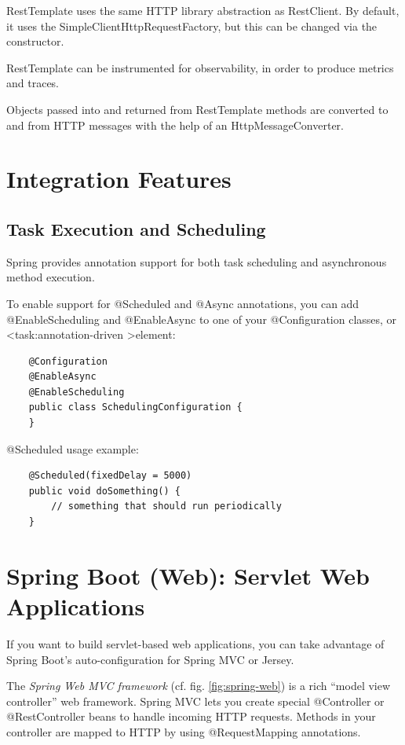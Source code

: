 \documentclass{scrartcl}
\begin{document}
RestTemplate uses the same HTTP library abstraction as RestClient. By default, it uses the SimpleClientHttpRequestFactory, but this can be changed via the constructor.

RestTemplate can be instrumented for observability, in order to produce metrics and traces.

Objects passed into and returned from RestTemplate methods are converted to and from HTTP messages with the help of an HttpMessageConverter.

\section{Integration Features}

\subsection{Task Execution and Scheduling}
Spring provides annotation support for both task scheduling and asynchronous method execution.

To enable support for @Scheduled and @Async annotations, you can add @EnableScheduling and @EnableAsync to one of your @Configuration classes, or \textless task:annotation-driven \textgreater element:

\begin{lstlisting}
    @Configuration
    @EnableAsync
    @EnableScheduling
    public class SchedulingConfiguration {
    }

\end{lstlisting}

@Scheduled usage example:

\begin{lstlisting}
    @Scheduled(fixedDelay = 5000)
    public void doSomething() {
        // something that should run periodically
    }
\end{lstlisting}

\section{Spring Boot (Web): Servlet Web Applications}

If you want to build servlet-based web applications, you can take advantage of Spring Boot’s auto-configuration for Spring MVC or Jersey.

The \textit{Spring Web MVC framework} (cf. fig. \ref{fig:spring-web}) is a rich “model view controller” web framework.
Spring MVC lets you create special @Controller or @RestController beans to handle incoming HTTP requests. Methods in your controller are mapped to HTTP by using @RequestMapping annotations.
\end{document}
